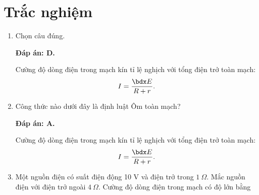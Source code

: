 \whiteBGstarBegin
\setcounter{section}{0}
\section{Trắc nghiệm}
\begin{enumerate}[label=\bfseries Câu \arabic*:]
	
	
	\item {}
	
	\cauhoi
	{Chọn câu đúng.
		
	}
	\loigiai
	{	\textbf{Đáp án: D.}
		
		Cường độ dòng điện trong mạch kín tỉ lệ nghịch với tổng điện trở toàn mạch:
		$$I=\dfrac{\calE}{R+r}.$$
	}
	\item {}
	
	\cauhoi
	{Công thức nào dưới đây là định luật Ôm toàn mạch?
		
	}
	\loigiai
	{	\textbf{Đáp án: A.}
		
		Cường độ dòng điện trong mạch kín tỉ lệ nghịch với tổng điện trở toàn mạch:
		$$I=\dfrac{\calE}{R+r}.$$
	}
	\item {}
	
	\cauhoi
	{Một nguồn điện có suất điện động 10 V và điện trở trong $\SI{1}{\Omega}$. Mắc nguồn điện với điện trở ngoài $\SI{4}{\Omega}$. Cường độ dòng điện trong mạch có độ lớn bằng
		
}
\end{enumerate}
